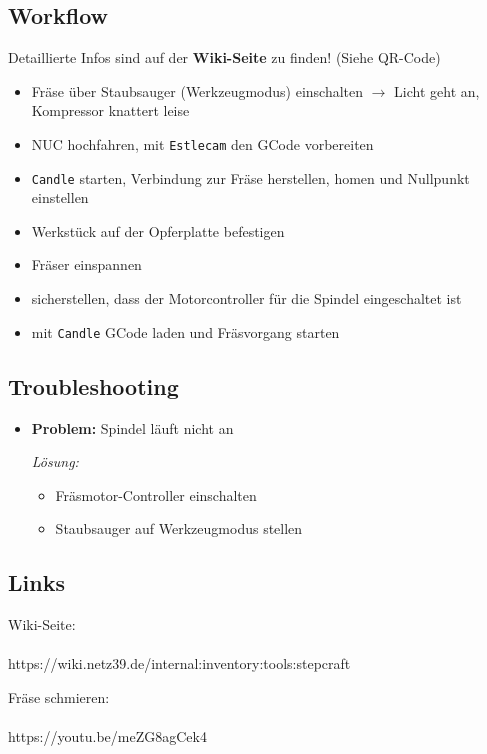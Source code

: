 \documentclass{article}
\begin{document}
	\subsection*{Workflow}
	Detaillierte Infos sind auf der\textbf{ Wiki-Seite} zu finden! (Siehe QR-Code)
	\begin{itemize}
		\item Fräse über Staubsauger (Werkzeugmodus) einschalten $\rightarrow$ Licht geht an, Kompressor knattert leise
		\item NUC hochfahren, mit \texttt{Estlecam} den GCode vorbereiten
		\item \texttt{Candle} starten, Verbindung zur Fräse herstellen, homen und Nullpunkt einstellen
		\item Werkstück auf der Opferplatte befestigen
		\item Fräser einspannen
		\item sicherstellen, dass der Motorcontroller für die Spindel eingeschaltet ist
		\item mit \texttt{Candle} GCode laden und Fräsvorgang starten
	\end{itemize}
	
	\noindent\dotfill
	\subsection*{Troubleshooting}
	\begin{itemize}
		\item \textbf{Problem:} Spindel läuft nicht an
		\begin{itemize}
			\textit{Lösung:}
			\begin{itemize}
				\item Fräsmotor-Controller einschalten
				\item Staubsauger auf Werkzeugmodus stellen
			\end{itemize}
		\end{itemize}
	\end{itemize}
	
	\noindent\dotfill
	\subsection*{Links}
	\begin{minipage}{0.45\textwidth}
		\centering
		Wiki-Seite:\\
		\\
		https://wiki.netz39.de/internal:inventory:tools:stepcraft
	\end{minipage}
	\hfill
	\begin{minipage}{0.45\textwidth}
		\centering
		Fräse schmieren:\\
		 \\
		https://youtu.be/meZG8agCek4 \\
	\end{minipage}
	\vspace{1em}
	
\end{document}
